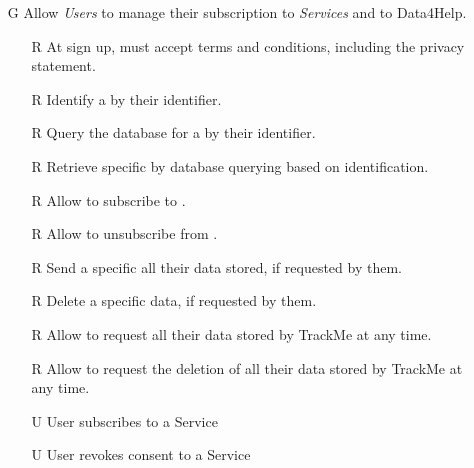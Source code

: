 \documentclass[../../../rasd.tex]{subfiles}
\begin{document}
\begin{itemize}
    \item[G\subs{5}]Allow \textit{Users} to manage their subscription to \textit{Services} and to Data4Help.
    \begin{itemize}
        \item[R\subs{4}]At sign up,  must accept terms and conditions, including the privacy statement.
        \item[R\subs{6}]Identify a  by their identifier.
        \item[R\subs{7}]Query the database for a  by their identifier.
        \item[R\subs{12}]Retrieve specific  by database querying based on  identification.
        \item[R\subs{30}]Allow  to subscribe to .
        \item[R\subs{31}]Allow  to unsubscribe from .
        \item[R\subs{32}]Send a specific  all their data stored, if requested by them.
        \item[R\subs{33}]Delete a  specific data, if requested by them.
        \item[R\subs{34}]Allow  to request all their data stored by TrackMe at any time.
        \item[R\subs{35}]Allow  to request the deletion of all their data stored by TrackMe at any time.
        \\
        \item[U\subs{10}]User subscribes to a Service
        \item[U\subs{11}]User revokes consent to a Service
    \end{itemize}
\end{itemize}
\end{document}
